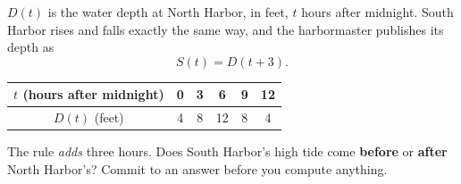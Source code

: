 \documentclass[10pt]{article}
\begin{document}
\boxguard[20]
\begin{hookbox}
$D(t)$ is the water depth at North Harbor, in feet, $t$ hours after midnight.
South Harbor rises and falls exactly the same way, and the harbormaster
publishes its depth as
\[
  S(t) = D(t + 3).
\]

\smallskip
\begin{center}
\renewcommand{\arraystretch}{1.4}
\begin{tabular}{|c|c|c|c|c|c|}
\hline
$t$ (hours after midnight) & 0 & 3 & 6 & 9 & 12 \\
\hline
$D(t)$ (feet) & 4 & 8 & 12 & 8 & 4 \\
\hline
\end{tabular}
\end{center}
\smallskip

The rule \textit{adds} three hours. Does South Harbor's high tide come
\textbf{before} or \textbf{after} North Harbor's? Commit to an answer before
you compute anything.
\end{hookbox}

\vspace{0.1in}
\end{document}

